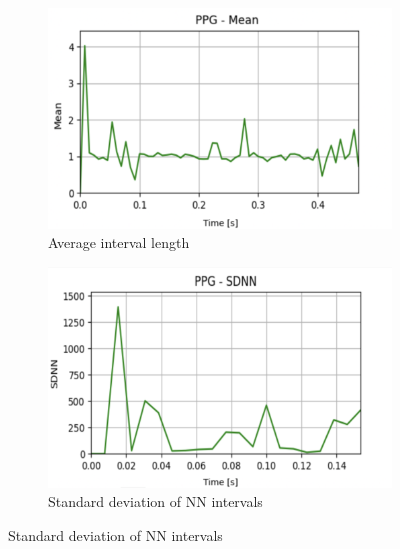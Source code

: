\documentclass[journal]{IEEEtran}
\begin{document}
\begin{figure}[h]
    \centering
    \begin{subfigure}{0.47\textwidth}
        \centering
        \includegraphics[width=\linewidth]{Mean.png}
        \caption{Average interval length}
    \end{subfigure}
    
   \vspace{0.2cm} 
    \begin{subfigure}{0.47\textwidth}
        \centering
        \includegraphics[width=\linewidth]{SDNN.png}
        \caption{Standard deviation of NN intervals}
    \end{subfigure}
    

\end{figure}
\end{document}
